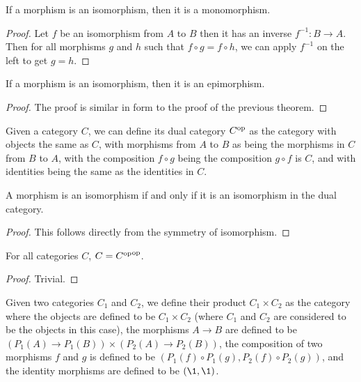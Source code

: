 \documentclass[../../math.tex]{subfiles}
\begin{document}
\begin{theorem} \label{isomorphism_monomorphism}
    If a morphism is an isomorphism, then it is a monomorphism.
\end{theorem}
\begin{proof}
    Let $f$ be an isomorphism from $A$ to $B$ then it has an inverse $f^{-1} : B
    \to A$.  Then for all morphisms $g$ and $h$ such that $f \circ g = f \circ
    h$, we can apply $f^{-1}$ on the left to get $g = h$.
\end{proof}

\begin{theorem} \label{isomorphism_epimorphism}
    If a morphism is an isomorphism, then it is an epimorphism.
\end{theorem}
\begin{proof}
    The proof is similar in form to the proof of the previous theorem.
\end{proof}

\begin{definition}
    Given a category $C$, we can define its dual category $C^{\mathrm{op}}$ as the
    category with objects the same as $C$, with morphisms from $A$ to $B$ as
    being the morphisms in $C$ from $B$ to $A$, with the composition $f \circ g$
    being the composition $g \circ f$ is $C$, and with identities being the same
    as the identities in $C$.
\end{definition}

\begin{theorem}
    A morphism is an isomorphism if and only if it is an isomorphism in the dual
    category.
\end{theorem}
\begin{proof}
    This follows directly from the symmetry of isomorphism.
\end{proof}

\begin{theorem}
    For all categories $C$, $C = {C^{\mathrm{op}}}^{\mathrm{op}}$.
\end{theorem}
\begin{proof}
    Trivial.
\end{proof}

\begin{definition}
    Given two categories $C_1$ and $C_2$, we define their product $C_1 \times
    C_2$ as the category where the objects are defined to be $C_1 \times C_2$
    (where $C_1$ and $C_2$ are considered to be the objects in this case), the
    morphisms $A \to B$ are defined to be $(P_1(A) \to P_1(B)) \times (P_2(A)
    \to P_2(B))$, the composition of two morphisms $f$ and $g$ is defined to be
    $(P_1(f) \circ P_1(g), P_2(f) \circ P_2(g))$, and the identity morphisms are
    defined to be $(\1, \1)$.
\end{definition}
\end{document}
